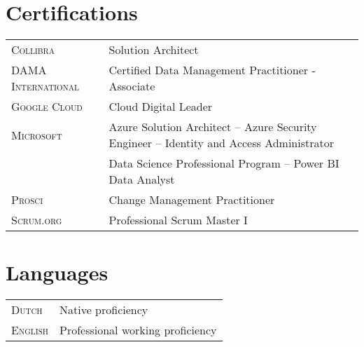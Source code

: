 \documentclass[a4paper,10pt]{article}
\begin{document}
\section{Certifications}
\begin{longtable}{R{3.4cm}|L{14.1cm}}
  \textsc{Collibra}& Solution Architect\\
  \textsc{DAMA International}& Certified Data Management Practitioner - Associate\\
  \textsc{Google Cloud}& Cloud Digital Leader\\
  \textsc{Microsoft}& Azure Solution Architect -- Azure Security Engineer -- Identity and Access Administrator\\
  \textsc{}& Data Science Professional Program -- Power BI Data Analyst\\
  \textsc{Prosci}& Change Management Practitioner\\  
  \textsc{Scrum.org}& Professional Scrum Master I\\
\end{longtable}

\section{Languages}
\begin{longtable}{R{3.4cm}|L{14.1cm}}
  \textsc{Dutch}& Native proficiency\\
  \textsc{English}& Professional working proficiency
\end{longtable}

\newpage
\end{document}
